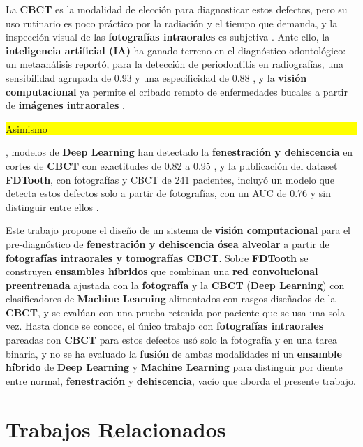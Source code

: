 \documentclass[runningheads]{llncs}
\newcommand{\prob}[1]{\textcolor{problema}{\textbf{#1}}}
\newcommand{\sol}[1]{\textcolor{solucion}{\textbf{#1}}}
\newcommand{\dat}[1]{\textcolor{dataset}{\textbf{#1}}}
\newcommand{\con}[1]{{\setlength{\fboxsep}{0.5pt}\colorbox{yellow}{\strut #1}}}
\newcommand{\res}[1]{\textcolor{resultado}{\textbf{#1}}}
\newcommand{\hal}[1]{{\sethlcolor{hallazgo}\hl{#1}}}
\newcommand{\prob}[1]{#1}
\newcommand{\sol}[1]{#1}
\newcommand{\dat}[1]{#1}
\newcommand{\con}[1]{#1}
\newcommand{\res}[1]{#1}
\newcommand{\hal}[1]{#1}
\begin{document}
La \dat{CBCT} es la modalidad de elección para diagnosticar estos
defectos, pero su uso rutinario es poco práctico por la radiación y el
tiempo que demanda, y la inspección visual de las \dat{fotografías
intraorales} es subjetiva \cite{liu2025fdtooth}. Ante ello, la
\sol{inteligencia artificial (IA)} ha ganado terreno en el diagnóstico
odontológico: un metaanálisis reportó, para la detección de periodontitis
en radiografías, una sensibilidad agrupada de 0.93 y una especificidad de
0.88 \cite{zhang2026periodontitis}, y la \sol{visión computacional} ya
permite el cribado remoto de enfermedades bucales a partir de
\dat{imágenes intraorales} \cite{chen2026surveillance}. \con{Asimismo},
modelos de \sol{Deep Learning} han detectado la \prob{fenestración y
dehiscencia} en cortes de \dat{CBCT} con exactitudes de 0.82 a 0.95
\cite{xu2026swinunetr}, y la publicación del dataset \dat{FDTooth}, con
fotografías y CBCT de 241 pacientes, incluyó un modelo que detecta estos
defectos solo a partir de fotografías, con un AUC de 0.76 y sin distinguir
entre ellos \cite{liu2025fdtooth}.

Este trabajo propone el diseño de un sistema de
\sol{visión computacional} para el pre-diagnóstico de \prob{fenestración y
dehiscencia ósea alveolar} a partir de \dat{fotografías intraorales y
tomografías CBCT}. Sobre \dat{FDTooth} se construyen
\sol{ensambles híbridos} que combinan una \sol{red convolucional
preentrenada} ajustada con la \dat{fotografía} y la \dat{CBCT}
(\sol{Deep Learning}) con clasificadores de \sol{Machine Learning}
alimentados con rasgos diseñados de la \dat{CBCT}, y se evalúan con una
prueba retenida por paciente que se usa una sola vez. Hasta donde se
conoce, el único trabajo con \dat{fotografías intraorales} pareadas con
\dat{CBCT} para estos defectos \cite{liu2025fdtooth} usó solo la
fotografía y en una tarea binaria, y no se ha evaluado la \sol{fusión} de
ambas modalidades ni un \sol{ensamble híbrido} de \sol{Deep Learning} y
\sol{Machine Learning} para distinguir por diente entre normal,
\prob{fenestración} y \prob{dehiscencia}, vacío que aborda el presente
trabajo.

\section{Trabajos Relacionados}
\end{document}
